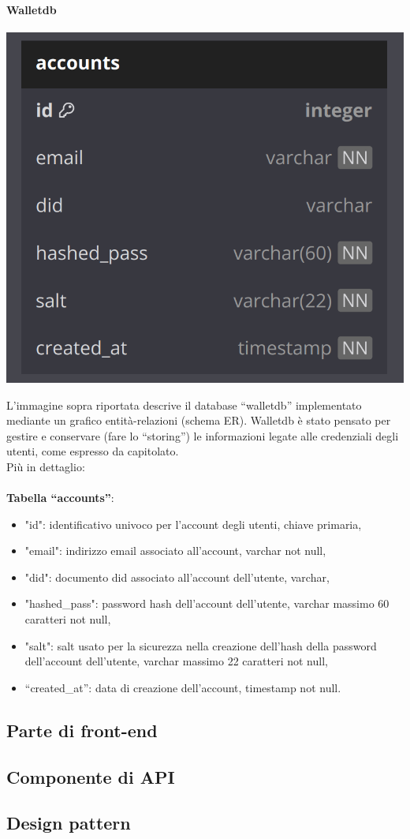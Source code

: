 \paragraph{Walletdb}
\begin{center}
    \includegraphics[scale = 0.3]{./res/img/walletdb.png}
  \end{center}

L’immagine sopra riportata descrive il database “walletdb” implementato mediante un grafico entità-relazioni (schema ER).
Walletdb è stato pensato per gestire e conservare (fare lo “storing”) le informazioni legate alle credenziali degli utenti, come espresso da capitolato.\\
Più in dettaglio:\\\\
\textbf{Tabella “accounts”}:
\begin{itemize}
    \item "id": identificativo univoco per l'account degli utenti, chiave primaria,
    \item "email": indirizzo email associato all'account, varchar not null,
    \item "did": documento did associato all'account dell'utente, varchar,
    \item "hashed\_pass": password hash dell'account dell'utente, varchar massimo 60 caratteri not null,
    \item "salt": salt usato per la sicurezza nella creazione dell'hash della password dell'account dell'utente, varchar massimo 22 caratteri not null,
    \item “created\_at”: data di creazione dell’account, timestamp not null.
\end{itemize}
\subsection{Parte di front-end}


\subsection{Componente di API}


\subsection{Design pattern}